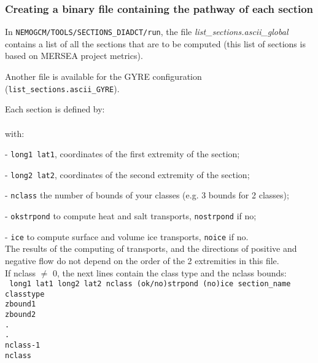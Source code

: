 \documentclass[../tex_main/NEMO_manual]{subfiles}
\begin{document}
\subsubsection{Creating a binary file containing the pathway of each section}

In \texttt{NEMOGCM/TOOLS/SECTIONS\_DIADCT/run},
the file \textit{ {list\_sections.ascii\_global}} contains a list of all the sections that are to be computed
(this list of sections is based on MERSEA project metrics).

Another file is available for the GYRE configuration (\texttt{ {list\_sections.ascii\_GYRE}}).

Each section is defined by: \\
 \\
with:

 - \texttt{long1 lat1}, coordinates of the  first extremity of the section;

 - \texttt{long2 lat2}, coordinates of the second extremity of the section;

 - \texttt{nclass}    the number of bounds of your classes (e.g. 3 bounds for 2 classes);

 - \texttt{okstrpond} to compute    heat and       salt transports, \texttt{nostrpond} if no;

 - \texttt{ice}       to compute surface and volume ice transports, \texttt{noice}     if no. \\

 \noindent The results of the computing of transports, and the directions of positive and
 negative flow do not depend on the order of the 2 extremities in this file. \\

\noindent If nclass $\neq$ 0, the next lines contain the class type and the nclass bounds: \\
{\scriptsize \texttt{
long1 lat1 long2 lat2 nclass (ok/no)strpond (no)ice section\_name \\
classtype                                                         \\
zbound1                                                           \\
zbound2                                                           \\
.                                                                 \\
.                                                                 \\
nclass-1                                                          \\
nclass}}
\end{document}
